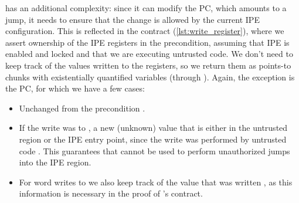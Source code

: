  has an additional complexity: since it can modify the PC, which amounts to a jump, it needs to ensure that the change is allowed by the current IPE configuration. This is reflected in the contract (\cref{lst:write_register}), where we assert ownership of the IPE registers in the precondition, assuming that IPE is enabled and locked and that we are executing untrusted code. We don't need to keep track of the values written to the registers, so we return them as points-to chunks with existentially quantified variables (through ). Again, the exception is the PC, for which we have a few cases:
\begin{itemize}
\item Unchanged from the precondition .
\item If the write was to , a new (unknown) value that is either in the untrusted region or the IPE entry point, since the write was performed by untrusted code . This guarantees that  cannot be used to perform unauthorized jumps into the IPE region.
\item For word writes to  we also keep track of the value that was written , as this information is necessary in the proof of 's contract.
\end{itemize}


